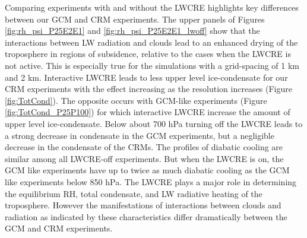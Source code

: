 \documentclass[draft]{agujournal2019}
\begin{document}
{Comparing experiments with and without the LWCRE highlights key differences between our GCM and CRM experiments.  
The upper panels of Figures \ref{fig:rh_psi_P25E2E1} and \ref{fig:rh_psi_P25E2E1_lwoff} show that the 
interactions between LW radiation and clouds lead to an enhanced
drying of the troposphere in regions of subsidence, relative to the cases when the LWCRE is not active.  
This is especially true for the simulations with a grid-spacing of 1 km and 2 km.  
Interactive LWCRE leads to less upper level ice-condensate for our CRM experiments
with the effect increasing as the resolution increases (Figure \ref{fig:TotCond}).  
The opposite occurs with GCM-like experiments (Figure \ref{fig:TotCond_P25P100}) for which interactive LWCRE increase 
the amount of upper level ice-condensate.    
Below about 700 hPa turning off the LWCRE leads to a strong decrease in condensate
in the GCM experiments, but a negligible decrease in the condensate of the CRMs.    
The profiles of diabatic cooling are similar among all LWCRE-off experiments.  
But when the LWCRE is on, the GCM like experiments have up to twice as much diabatic cooling as the GCM like experiments below 850 hPa.
The LWCRE plays a major role in determining the equilibrium RH, total condensate, and LW radiative 
heating of the troposphere.  However the manifestations of interactions between clouds and radiation as indicated
by these characteristics differ dramatically between the GCM and CRM experiments.   



}
\end{document}
